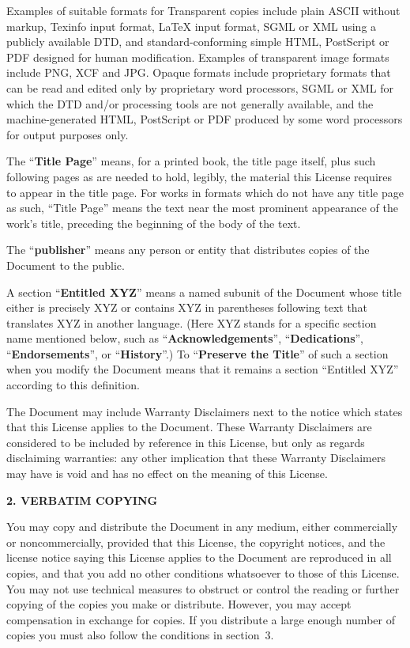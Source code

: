 Examples of suitable formats for Transparent copies include plain ASCII without
markup, Texinfo input format, LaTeX input format, SGML or XML using a publicly
available DTD, and standard-conforming simple HTML, PostScript or PDF designed
for human modification. Examples of transparent image formats include PNG, XCF
and JPG. Opaque formats include proprietary formats that can be read and edited
only by proprietary word processors, SGML or XML for which the DTD and/or
processing tools are not generally available, and the machine-generated HTML,
PostScript or PDF produced by some word processors for output purposes only.

The ``\textbf{Title Page}'' means, for a printed book, the title page itself,
plus such following pages as are needed to hold, legibly, the material this
License requires to appear in the title page. For works in formats which do not
have any title page as such, ``Title Page'' means the text near the most
prominent appearance of the work's title, preceding the beginning of the body of
the text.

The ``\textbf{publisher}'' means any person or entity that distributes copies of
the Document to the public.

A section ``\textbf{Entitled XYZ}'' means a named subunit of the Document whose
title either is precisely XYZ or contains XYZ in parentheses following text that
translates XYZ in another language. (Here XYZ stands for a specific section name
mentioned below, such as ``\textbf{Acknowledgements}'',
``\textbf{Dedications}'', ``\textbf{Endorsements}'', or ``\textbf{History}''.)
To ``\textbf{Preserve the Title}'' of such a section when you modify the
Document means that it remains a section ``Entitled XYZ'' according to this
definition.

The Document may include Warranty Disclaimers next to the notice which states
that this License applies to the Document. These Warranty Disclaimers are
considered to be included by reference in this License, but only as regards
disclaiming warranties: any other implication that these Warranty Disclaimers
may have is void and has no effect on the meaning of this License.


\begin{center}
  {\Large\bf 2. VERBATIM COPYING\par} 
\end{center}

You may copy and distribute the Document in any medium, either commercially or
noncommercially, provided that this License, the copyright notices, and the
license notice saying this License applies to the Document are reproduced in all
copies, and that you add no other conditions whatsoever to those of this
License. You may not use technical measures to obstruct or control the reading
or further copying of the copies you make or distribute. However, you may accept
compensation in exchange for copies. If you distribute a large enough number of
copies you must also follow the conditions in section~3.

